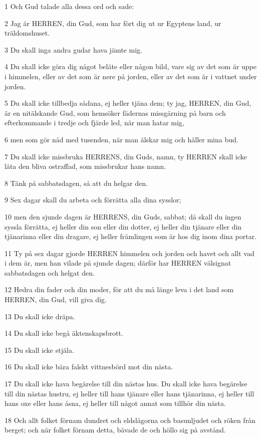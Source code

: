 \par 1 Och Gud talade alla dessa ord och sade:
\par 2 Jag är HERREN, din Gud, som har fört dig ut ur Egyptens land, ur träldomshuset.
\par 3 Du skall inga andra gudar hava jämte mig.
\par 4 Du skall icke göra dig något beläte eller någon bild, vare sig av det som är uppe i himmelen, eller av det som är nere på jorden, eller av det som är i vattnet under jorden.
\par 5 Du skall icke tillbedja sådana, ej heller tjäna dem; ty jag, HERREN, din Gud, är en nitälskande Gud, som hemsöker fädernas missgärning på barn och efterkommande i tredje och fjärde led, när man hatar mig,
\par 6 men som gör nåd med tusenden, när man älskar mig och håller mina bud.
\par 7 Du skall icke missbruka HERRENS, din Guds, namn, ty HERREN skall icke låta den bliva ostraffad, som missbrukar hans namn.
\par 8 Tänk på sabbatsdagen, så att du helgar den.
\par 9 Sex dagar skall du arbeta och förrätta alla dina sysslor;
\par 10 men den sjunde dagen är HERRENS, din Guds, sabbat; då skall du ingen syssla förrätta, ej heller din son eller din dotter, ej heller din tjänare eller din tjänarinna eller din dragare, ej heller främlingen som är hos dig inom dina portar.
\par 11 Ty på sex dagar gjorde HERREN himmelen och jorden och havet och allt vad i dem är, men han vilade på sjunde dagen; därför har HERREN välsignat sabbatsdagen och helgat den.
\par 12 Hedra din fader och din moder, för att du må länge leva i det land som HERREN, din Gud, vill giva dig.
\par 13 Du skall icke dräpa.
\par 14 Du skall icke begå äktenskapsbrott.
\par 15 Du skall icke stjäla.
\par 16 Du skall icke bära falskt vittnesbörd mot din nästa.
\par 17 Du skall icke hava begärelse till din nästas hus. Du skall icke hava begärelse till din nästas hustru, ej heller till hans tjänare eller hans tjänarinna, ej heller till hans oxe eller hans åsna, ej heller till något annat som tillhör din nästa.
\par 18 Och allt folket förnam dundret och eldslågorna och basunljudet och röken från berget; och när folket förnam detta, bävade de och höllo sig på avstånd.
